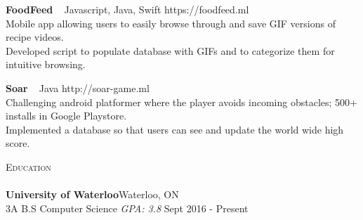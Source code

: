 \documentclass[a4paper]{article}
\newcommand{\lineunder} {
    \vspace*{-8pt} \\
    \hspace*{-18pt} \hrulefill \\
}
\newcommand{\header} [1] {
    {\hspace*{-18pt}\vspace*{6pt} \textsc{#1}}
    \vspace*{-6pt} \lineunder
}
\begin{document}
{\textbf{FoodFeed}} {\ \textbar{} Javascript, Java, Swift} \hfill https://foodfeed.ml\\
Mobile app allowing users to easily browse through and save GIF versions of recipe videos.\\
Developed script to populate database with GIFs and to categorize them for intuitive browsing. \\
\vspace*{2mm}

{\textbf{Soar}} {\ \textbar{} Java} \hfill http://soar-game.ml\\
Challenging android platformer where the player avoids incoming obstacles; 500+ installs in Google Playstore.\\
Implemented a database so that users can see and update the world wide high score.\\
\vspace*{2mm}

\header{Education}
\textbf{University of Waterloo}\hfill Waterloo, ON\\
3A B.S Computer Science \textit{GPA: 3.8} \hfill Sept 2016 - Present\\


\vspace{2mm}

\ 
\end{document}
